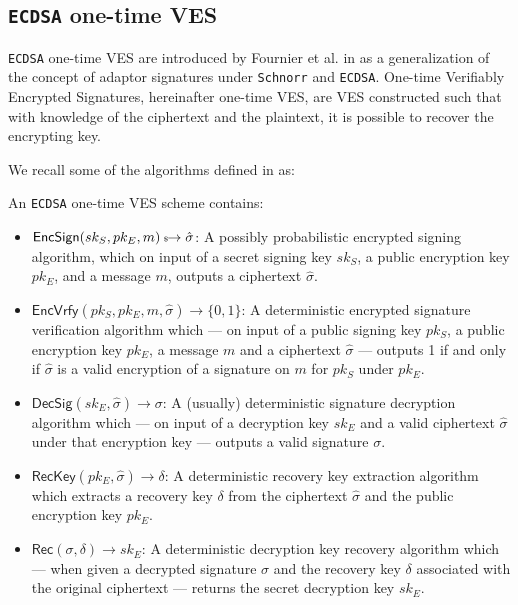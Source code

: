 \documentclass{llncs}
\newcommand{\EncSign}{\textsf{EncSign}}
\newcommand{\EncVer}{\textsf{EncVrfy}}
\newcommand{\DecSig}{\textsf{DecSig}}
\newcommand{\Rec}{\textsf{Rec}}
\newcommand{\RecKey}{\textsf{RecKey}}
\newcommand{\hatsigma}{\hat{\sigma}}
\newcommand{\skSign}{sk_S}
\newcommand{\pkSign}{pk_S}
\newcommand{\skEnc}{sk_E}
\newcommand{\pkEnc}{pk_E}
\newcommand{\rec}{\delta}
\newcommand{\bin}{\{0,1\}}
\begin{document}
\subsection{\texttt{ECDSA} one-time VES}
\label{oneTimeEcdsaVES}
\texttt{ECDSA} one-time VES are introduced by Fournier et al. in \cite{oneTimeVES} as a generalization of the concept of adaptor signatures under \texttt{Schnorr} \cite{Schnorr:1989:EIS:646754.705037} and \texttt{ECDSA}. One-time Verifiably Encrypted Signatures, hereinafter one-time VES, are VES constructed such that with knowledge of the ciphertext and the plaintext, it is possible to recover the encrypting key.

We recall some of the algorithms defined in \cite{oneTimeVES} as:

\begin{definition}
    An \texttt{ECDSA} one-time VES scheme contains:
\begin{itemize}
    \item $\EncSign(\skSign, \pkEnc, m) \hskip2.3pt{\mbox{\tiny${\$}$\normalsize}}\!\!\rightarrow \hatsigma$: A possibly probabilistic encrypted signing algorithm, which on input of a secret signing key $\skSign$, a public encryption key $\pkEnc$, and a message $m$, outputs a ciphertext $\hatsigma$.
    \item $\EncVer(\pkSign, \pkEnc, m, \hatsigma) \rightarrow \bin$: A deterministic encrypted signature verification algorithm which --- on input of a public signing key $\pkSign$, a public encryption key $\pkEnc$, a message $m$ and a ciphertext $\hatsigma$ --- outputs 1 if and only if $\hatsigma$ is a valid encryption of a signature on $m$ for $\pkSign$ under $\pkEnc$.
    \item $\DecSig(\skEnc, \hatsigma) \rightarrow \sigma$: A (usually) deterministic signature decryption algorithm which --- on input of a decryption key $\skEnc$ and a valid ciphertext $\hatsigma$ under that encryption key --- outputs a valid signature $\sigma$.
    \item $\RecKey(\pkEnc, \hatsigma) \rightarrow \delta$: A deterministic recovery key extraction algorithm which extracts a recovery key $\delta$ from the ciphertext $\hatsigma$ and the public encryption key $\pkEnc$.
    \item $\Rec(\sigma,\rec) \rightarrow \skEnc$: A deterministic decryption key recovery algorithm which --- when given a decrypted signature $\sigma$ and the recovery key $\rec$ associated with the original ciphertext --- returns the secret decryption key $\skEnc$.
\end{itemize}
\end{definition}
\end{document}

